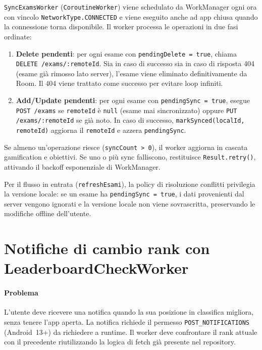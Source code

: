 \documentclass[a4paper,12pt]{report}
\begin{document}
    \texttt{SyncExamsWorker} (\texttt{CoroutineWorker}) viene schedulato da WorkManager
    ogni ora con vincolo \texttt{NetworkType.CONNECTED} e viene eseguito anche ad app
    chiusa quando la connessione torna disponibile. Il worker processa le operazioni
    in due fasi ordinate:
    \begin{enumerate}
        \item \textbf{Delete pendenti}: per ogni esame con \texttt{pendingDelete = true},
        chiama \texttt{DELETE /exams/:remoteId}. Sia in caso di successo sia in caso di
        risposta 404 (esame già rimosso lato server), l'esame viene eliminato definitivamente
        da Room. Il 404 viene trattato come successo per evitare loop infiniti.
        \item \textbf{Add/Update pendenti}: per ogni esame con \texttt{pendingSync = true},
        esegue \texttt{POST /exams} se \texttt{remoteId} è \texttt{null} (esame mai
        sincronizzato) oppure \texttt{PUT /exams/:remoteId} se già noto. In caso di
        successo, \texttt{markSynced(localId, remoteId)} aggiorna il \texttt{remoteId}
        e azzera \texttt{pendingSync}.
    \end{enumerate}
    Se almeno un'operazione riesce (\texttt{syncCount > 0}), il worker aggiorna
    in cascata gamification e obiettivi. Se uno o più sync falliscono, restituisce
    \texttt{Result.retry()}, attivando il backoff esponenziale di WorkManager.

    Per il flusso in entrata (\texttt{refreshEsami}), la policy di risoluzione conflitti
    privilegia la versione locale: se un esame ha \texttt{pendingSync = true}, i dati
    provenienti dal server vengono ignorati e la versione locale non viene sovrascritta,
    preservando le modifiche offline dell'utente.

    \section{Notifiche di cambio rank con LeaderboardCheckWorker}

    \paragraph{Problema}
    L'utente deve ricevere una notifica quando la sua posizione in classifica migliora,
    senza tenere l'app aperta. La notifica richiede il permesso \texttt{POST\_NOTIFICATIONS}
    (Android~13+) da richiedere a runtime. Il worker deve confrontare il rank attuale
    con il precedente riutilizzando la logica di fetch già presente nel repository.
\end{document}

